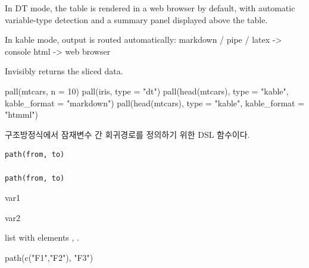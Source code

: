 \documentclass[a4paper]{book}
\begin{document}
%
\begin{Details}
In DT mode, the table is rendered in a web browser by default, with
automatic variable-type detection and a summary panel displayed above
the table.

In kable mode, output is routed automatically:
markdown / pipe / latex -> console
html                    -> web browser
\end{Details}
%
\begin{Value}
Invisibly returns the sliced data.
\end{Value}
%
\begin{Examples}
\begin{ExampleCode}
pall(mtcars, n = 10)
pall(iris, type = "dt")
pall(head(mtcars), type = "kable", kable_format = "markdown")
pall(head(mtcars), type = "kable", kable_format = "htmml")

\end{ExampleCode}
\end{Examples}

%
\begin{Description}
구조방정식에서 잠재변수 간 회귀경로를 정의하기 위한 DSL 함수이다.
\end{Description}
%
\begin{Usage}
\begin{verbatim}
path(from, to)

path(from, to)
\end{verbatim}
\end{Usage}
%
\begin{Arguments}
\begin{ldescription}
\item[\code{from}] var1

\item[\code{to}] var2
\end{ldescription}
\end{Arguments}
%
\begin{Value}
list with elements , .
\end{Value}
%
\begin{Examples}
\begin{ExampleCode}
path(c("F1","F2"), "F3")
\end{ExampleCode}
\end{Examples}
\end{document}
